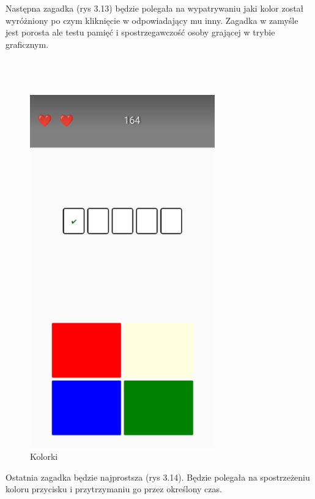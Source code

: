 \hspace{-0.60cm}Następna zagadka (rys 3.13) będzie polegała na wypatrywaniu jaki kolor został wyróżniony po czym kliknięcie w odpowiadający mu inny. Zagadka w zamyśle jest porosta ale testu pamięć i spostrzegawczość osoby grającej w trybie graficznym.
\\
\\
\\
\\
	\begin{figure}[!htb]
	\begin{center}
		\includegraphics[width=8cm]{rys/gra99.png}
		\caption{Kolorki}
		\label{rys:rysunek001}
	\end{center}
\end{figure}

\hspace{-0.60cm}Ostatnia zagadka będzie najprostsza (rys 3.14). Będzie polegała na spostrzeżeniu koloru przycisku i przytrzymaniu go przez określony czas. 

